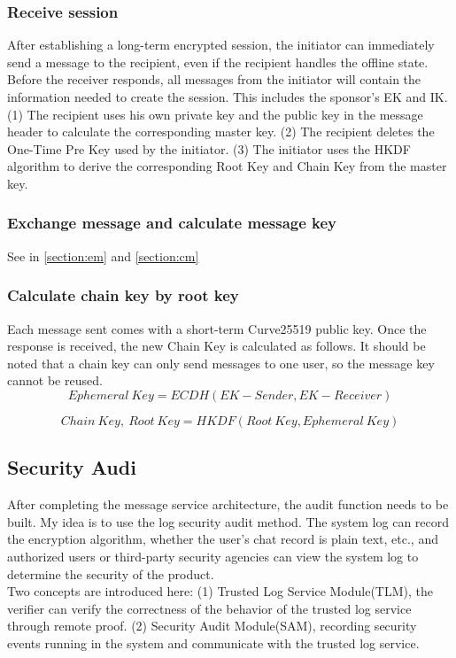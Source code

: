 \documentclass[11pt]{article}
\begin{document}
\subsubsection{Receive session}
After establishing a long-term encrypted session, the initiator can immediately send a message to the recipient, even if the recipient handles the offline state. 
Before the receiver responds, all messages from the initiator will contain the information needed to create the session. 
This includes the sponsor's EK and IK.\\
(1) The recipient uses his own private key and the public key in the message header to calculate the corresponding master key.
(2) The recipient deletes the One-Time Pre Key used by the initiator.
(3) The initiator uses the HKDF algorithm to derive the corresponding Root Key and Chain Key from the master key.

\subsubsection{Exchange message and calculate message key}
See in \ref{section:em} and \ref{section:cm}

\subsubsection{Calculate chain key by root key}
Each message sent comes with a short-term Curve25519 public key. 
Once the response is received, the new Chain Key is calculated as follows. It should be noted that a chain key can only send messages to one user, so the message key cannot be reused.
\begin{equation}
    Ephemeral\ Key  = ECDH(EK-Sender, EK-Receiver)
\end{equation}

\begin{equation}
    Chain\ Key,\ Root\ Key =  HKDF(Root\ Key, Ephemeral\ Key)
\end{equation}


\subsection{Security Audi}

After completing the message service architecture, the audit function needs to be built. 
My idea is to use the log security audit method. The system log can record the encryption algorithm, whether the user's chat record is plain text, etc., and authorized users or third-party security agencies can view the system log to determine the security of the product.\\
Two concepts are introduced here: (1) Trusted Log Service Module(TLM), the verifier can verify the correctness of the behavior of the trusted log service through remote proof.
(2) Security Audit Module(SAM), recording security events running in the system and communicate with the trusted log service.
\end{document}
